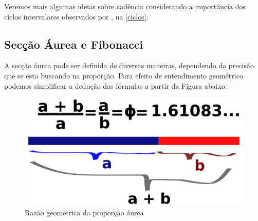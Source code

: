 \documentclass[
	12pt,				%
	openright,			%
	twoside,			%
	a4paper,			%
	english,			%
	french,				%
	spanish,			%
	brazil				%
	]{abntex2}
\begin{document}
Veremos mais algumas ideias sobre cadência considerando a importância dos ciclos intervalares observados por , na \autoref{ciclos}.






\subsection{Secção Áurea e Fibonacci}
\label{fibo}

A secção áurea pode ser definida de diversas maneiras, dependendo da precisão que se esta buscando na proporção. Para efeito de entendimento geométrico podemos simplificar a dedução das fórmulas a partir da Figura abaixo: 

\begin{figure}[!h]
	\caption{\label{fig_grafico}Razão geométrica da proporção áurea }
	\begin{center}
	    \includegraphics[scale=0.25]{axis/proportionaurea.png}
	\end{center}
\end{figure}	
\end{document}
